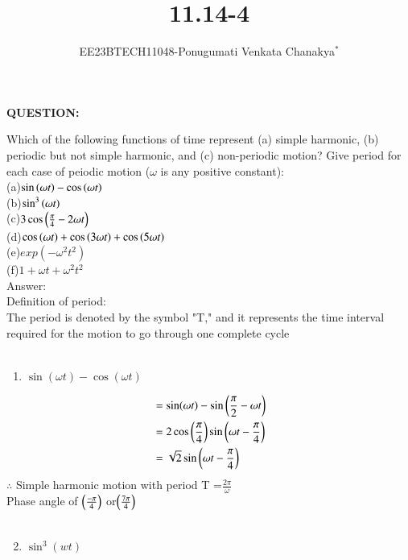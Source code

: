\documentclass[journal,12pt,twocolumn]{IEEEtran}
\theoremstyle{remark}
\begin{document}
 
 \vspace{3cm}
 \title{\textbf{11.14-4}}
 \author{EE23BTECH11048-Ponugumati Venkata Chanakya$^{*}$%
 }
 \maketitle
 \newpage
 \bigskip
 \renewcommand{\thefigure}{\theenumi}
 \renewcommand{\thetable}{\theenumi}
 \textbf{QUESTION:}
 
 Which of the following functions of time represent (a) simple harmonic, (b) periodic
 but not simple harmonic, and (c) non-periodic motion? Give period for each case of
 peiodic motion ($\omega$ is any positive constant):\\
 (a)$\sin\left(\omega t\right)-\cos\left(\omega t\right)$\\
 (b)$\sin^3\left(\omega t\right)$\\
 (c)$3\cos\left(\frac{\pi}{4}- 2\omega t\right)$\\
 (d)$\cos\left(\omega t\right)+\cos\left(3\omega t\right)+\cos\left(5\omega t\right)$\\
 (e)$exp(-\omega^2 t^2)$\\
 (f)$1+\omega t+\omega^2 t^2$\\
 Answer:\\
   Definition of period:\\The period is denoted by the symbol "T," and it represents the time interval required for the motion to go through one complete cycle\\
   \\
   \begin{enumerate}
 \item $\sin(\omega t)- \cos(\omega t)$\\
  \end{enumerate}
 \begin{align}
  &= \sin(\omega t) - \sin\left(\frac{\pi}{2} - \omega t\right)\\
  &=2 \cos\left(\frac{\pi}{4}\right) \sin\left(\omega t - \frac{\pi}{4}\right)\\
  &=\sqrt{2}\sin\left(\omega t - \frac{\pi}{4}\right)
 \end{align}
 $\therefore$ Simple harmonic motion with period {T} =$\frac{2\pi}{\omega}$\\ Phase angle of $\left(\frac{-\pi}{4}\right)$ or$\left(\frac{7\pi}{4}\right)$\\
\\
\begin{enumerate}
 \setcounter{enumi}{1} 
    \item $\sin^3(wt)$\\
\end{enumerate}
 
\end{document}
